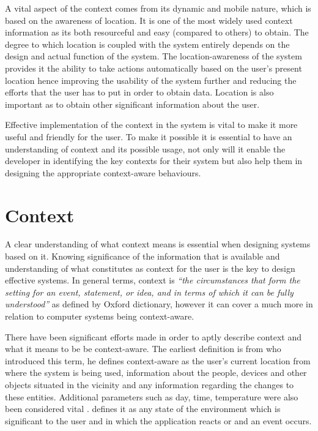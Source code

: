 \documentclass[12pt]{report}
\begin{document}
A vital aspect of the context comes from its dynamic and mobile nature, which is based on the awareness of location. It is one of the most widely used context information as its both resourceful and easy (compared to others) to obtain. The degree to which location is coupled with the system entirely depends on the design and actual function of the system. The location-awareness of the system provides it the ability to take actions automatically based on the user's present location hence improving the usability of the system further and reducing the efforts that the user has to put in order to obtain data. Location is also important as to obtain other significant information about the user.


Effective implementation of the context in the system is vital to make it more useful and friendly for the user. To make it possible it is essential to have an understanding of context and its possible usage, not only will it enable the developer in identifying the key contexts for their system but also help them in designing the appropriate context-aware behaviours.

\noindent

\section{Context}
A clear understanding of what context means is essential when designing systems based on it. Knowing significance of the information that is available and understanding of what constitutes as context for the user is the key to design effective systems. In general terms, context is \textit{``the circumstances that form the setting for an event, statement, or idea, and in terms of which it can be fully understood''} as defined by Oxford dictionary, however it can cover a much more in relation to computer systems being context-aware. 

There have been significant efforts made in order to aptly describe context and what it means to be be context-aware. The earliest definition is from \cite{schilit1994context} who introduced this term, he defines context-aware as the user's current location from where the system is being used, information about the people, devices and other objects situated in the vicinity and any information regarding the changes to these entities. Additional parameters such as day, time, temperature were also been considered vital \cite{brown1996supporting}. \cite{prekop2003activities} defines it as any state of the environment which is significant to the user and in which the application reacts or and an event occurs. 
\end{document}
